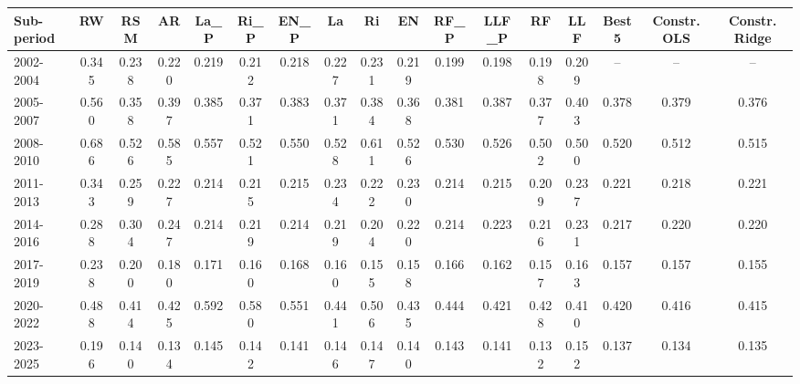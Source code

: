 \begin{tabular}{lcccccccccccccccc}
\toprule
Sub-period & RW & RSM & AR & La\_P & Ri\_P & EN\_P & La & Ri & EN & RF\_P & LLF\_P & RF & LLF & Best 5 & Constr. OLS & Constr. Ridge
\\
\midrule
2002-2004 & 0.345 & 0.238 & 0.220 & 0.219 & 0.212 & 0.218 & 0.227 & 0.231 & 0.219 & 0.199 & 0.198 & 0.198 & 0.209 & -- & -- & -- \\
2005-2007 & 0.560 & 0.358 & 0.397 & 0.385 & 0.371 & 0.383 & 0.371 & 0.384 & 0.368 & 0.381 & 0.387 & 0.377 & 0.403 & 0.378 & 0.379 & 0.376 \\
2008-2010 & 0.686 & 0.526 & 0.585 & 0.557 & 0.521 & 0.550 & 0.528 & 0.611 & 0.526 & 0.530 & 0.526 & 0.502 & 0.500 & 0.520 & 0.512 & 0.515 \\
2011-2013 & 0.343 & 0.259 & 0.227 & 0.214 & 0.215 & 0.215 & 0.234 & 0.222 & 0.230 & 0.214 & 0.215 & 0.209 & 0.237 & 0.221 & 0.218 & 0.221 \\
2014-2016 & 0.288 & 0.304 & 0.247 & 0.214 & 0.219 & 0.214 & 0.219 & 0.204 & 0.220 & 0.214 & 0.223 & 0.216 & 0.231 & 0.217 & 0.220 & 0.220 \\
2017-2019 & 0.238 & 0.200 & 0.180 & 0.171 & 0.160 & 0.168 & 0.160 & 0.155 & 0.158 & 0.166 & 0.162 & 0.157 & 0.163 & 0.157 & 0.157 & 0.155 \\
2020-2022 & 0.488 & 0.414 & 0.425 & 0.592 & 0.580 & 0.551 & 0.441 & 0.506 & 0.435 & 0.444 & 0.421 & 0.428 & 0.410 & 0.420 & 0.416 & 0.415 \\
2023-2025 & 0.196 & 0.140 & 0.134 & 0.145 & 0.142 & 0.141 & 0.146 & 0.147 & 0.140 & 0.143 & 0.141 & 0.132 & 0.152 & 0.137 & 0.134 & 0.135 \\
\bottomrule
\end{tabular}
